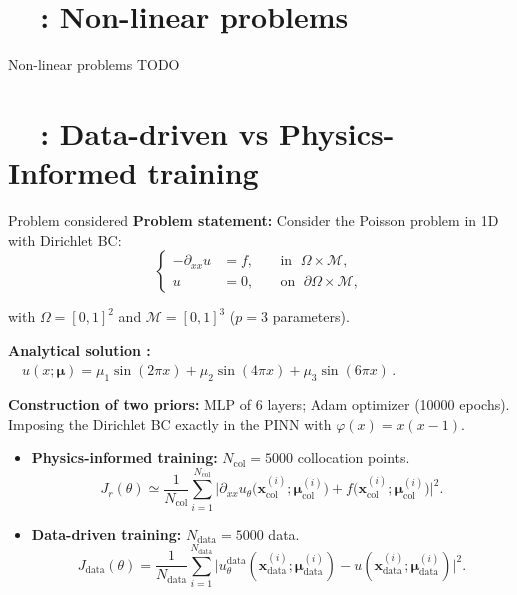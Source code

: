 \section{\appendixname~\theappendixframenumber~: Non-linear problems}

\begin{frame}{Non-linear problems}
	TODO
\end{frame}
\addtocounter{appendixframenumber}{1}

\section{\appendixname~\theappendixframenumber~: Data-driven vs Physics-Informed training}

\begin{frame}{Problem considered}
	\textbf{Problem statement:} Consider the Poisson problem in 1D with Dirichlet BC:
	\vspace{-5pt}
	\begin{equation*}
		\left\{
		\begin{aligned}
			-\partial_{xx} u & = f, \; &  & \text{in } \; \Omega \times \mathcal{M}, \\
			u         & = 0, \;  &  & \text{on } \; \partial\Omega \times \mathcal{M},
		\end{aligned}
		\right.
	\end{equation*}

	\vspace{-5pt}
	with $\Omega=[0,1]^2$ and $\mathcal{M}=[0,1]^3$ ($p=3$ parameters).
		
	\vspace{4pt}
	\textbf{Analytical solution :} $\quad u(x;\bm{\mu})=\mu_1\sin(2\pi x)+\mu_2\sin(4\pi x)+\mu_3\sin(6\pi x) \,.$

	\vspace{4pt}
	\textbf{Construction of two priors:} MLP of 6 layers; Adam optimizer (10000 epochs). \\
	Imposing the Dirichlet BC exactly in the PINN with $\varphi(x)=x(x-1)$.

	\begin{itemize}
		\item \textbf{Physics-informed training:} $N_\text{col}=5000$ collocation points.
		$$J_r(\theta) \simeq
			\frac{1}{N_\text{col}} \sum_{i=1}^{N_\text{col}} \big| \partial_{xx}u_\theta(\bm{x}_\text{col}^{(i)};\bm{\mu}_\text{col}^{(i)}\big) + f\big(\bm{x}_\text{col}^{(i)};\bm{\mu}_\text{col}^{(i)}\big) \big|^2.$$
	
		\item \textbf{Data-driven training:}  $N_\text{data}=5000$ data.
		$$J_\text{data}(\theta) =
		\frac{1}{N_\text{data}}
		\sum_{i=1}^{N_\text{data}} \big| u_\theta^\text{data}(\bm{x}_\text{data}^{(i)};\bm{\mu}_\text{data}^{(i)}) - u(\bm{x}_\text{data}^{(i)};\bm{\mu}_\text{data}^{(i)}) \big|^2.$$
	\end{itemize}
\end{frame}

